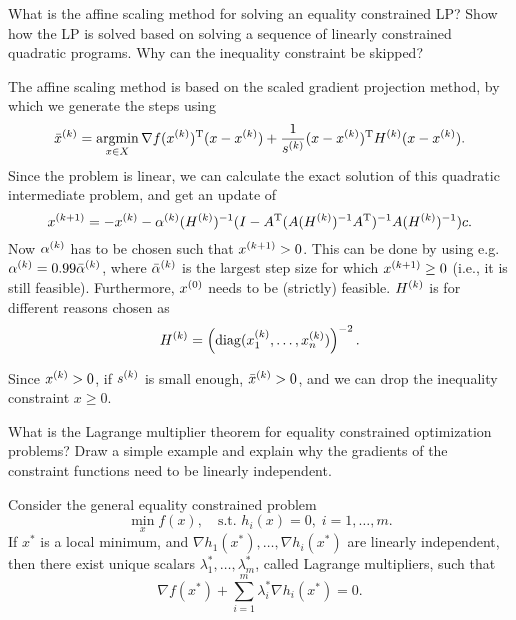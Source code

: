 \documentclass{article}
\begin{document}
\begin{question}
  What is the affine scaling method for solving an equality constrained LP? Show how the LP is
  solved based on solving a sequence of linearly constrained quadratic programs. Why can the
  inequality constraint be skipped?
\end{question}

The affine scaling method is based on the scaled gradient projection method, by which we generate
the steps using
\begin{equation*}
  \kth{\bar{x}} = \argmin_{x \in X} \T{\nabla f(\kth{x})} (x - \kth{x}) +
  \frac{1}{\kth{s}} \T{(x - \kth{x})} \kth{H} (x - \kth{x}).
\end{equation*}
Since the problem is linear, we can calculate the exact solution of this quadratic intermediate
problem, and get an update of
\begin{equation*}
  \kth[k+1]{x} = -\kth{x} -
  \kth{\alpha}(\kth{H})^{-1}(I - \T{A} (A(\kth{H})^{-1}\T{A})^{-1} A (\kth{H})^{-1})c.
\end{equation*}
Now \(\kth{\alpha}\) has to be chosen such that \(\kth[k+1]{x} > 0\).  This can be done by using
e.g. \(\kth{\alpha} = 0.99\kth{\bar{\alpha}}\), where \(\kth{\bar{\alpha}}\) is the largest step
size for which \(\kth[k+1]{x} \geq 0\) (i.e., it is still feasible).  Furthermore, \(\kth[0]{x}\)
needs to be (strictly) feasible. \(\kth{H}\) is for different reasons chosen as
\begin{equation*}
  \kth{H} = \left( \diag(\kth{x}_1, \dots, \kth{x}_n) \right)^{-2}.
\end{equation*}

Since \(\kth{x} > 0\), if \(\kth{s}\) is small enough, \(\kth{\bar{x}} > 0\), and we can drop the
inequality constraint \(x \geq 0\).


\begin{question}
  What is the Lagrange multiplier theorem for equality constrained optimization problems? Draw a
  simple example and explain why the gradients of the constraint functions need to be linearly
  independent.
\end{question}

Consider the general equality constrained problem
\begin{equation*}
  \min_x f(x), \quad\text{s.t. } h_i(x) = 0, \; i = 1, \dots, m.
\end{equation*}
If \(x^*\) is a local minimum, and \(\nabla h_1(x^*), \dots, \nabla h_i(x^*)\) are linearly
independent, then there exist unique scalars \(\lambda^*_1, \dots, \lambda^*_m\), called Lagrange
multipliers, such that
\begin{equation*}
  \nabla f(x^*) + \sum_{i=1}^m \lambda^*_i \nabla h_i(x^*) = 0.
\end{equation*}
\end{document}
